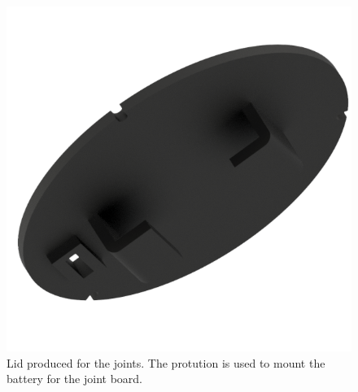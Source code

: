 \begin{figure}[h]
	\centering
	\includegraphics[width=.4\linewidth]{graphics/joint_lid}
	\caption[Lid produced for the joints.]{Lid produced for the joints. The protution is used to mount the battery for the joint board.}
	\label{fig:joint_lid}
\end{figure}